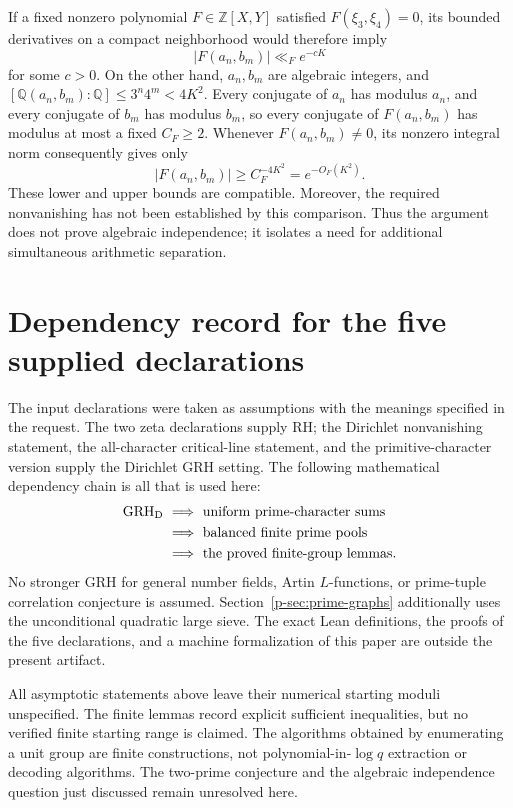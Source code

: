\documentclass[11pt,a4paper]{article}
\theoremstyle{definition}
\theoremstyle{remark}
\begin{document}
If a fixed nonzero polynomial $F\in\mathbb Z[X,Y]$ satisfied
$F(\xi_3,\xi_4)=0$, its bounded derivatives on a compact neighborhood
would therefore imply
\[
 |F(a_n,b_m)|\ll_F e^{-cK}
\]
for some $c>0$. On the other hand, $a_n,b_m$ are algebraic integers,
and
$[\mathbb Q(a_n,b_m):\mathbb Q]\leq3^n4^m<4K^2$.
Every conjugate of $a_n$ has modulus $a_n$, and every conjugate of
$b_m$ has modulus $b_m$, so every conjugate of $F(a_n,b_m)$ has
modulus at most a fixed $C_F\geq2$. Whenever $F(a_n,b_m)\ne0$,
its nonzero integral norm consequently gives only
\[
 |F(a_n,b_m)|\geq C_F^{-4K^2}
 =e^{-O_F(K^2)}.
\]
These lower and upper bounds are compatible. Moreover, the required
nonvanishing has not been established by this comparison. Thus the
argument does not prove algebraic independence; it isolates a need
for additional simultaneous arithmetic separation.



\section{Dependency record for the five supplied declarations}
The input declarations were taken as assumptions with the meanings
specified in the request. The two zeta declarations supply RH; the
Dirichlet nonvanishing statement, the all-character critical-line
statement, and the primitive-character version supply the Dirichlet
GRH setting. The following mathematical dependency chain is all that
is used here:
\[
\begin{aligned}
 \mathrm{GRH}_{\mathrm D}&\ \Longrightarrow\ \text{uniform prime-character sums}\\
       &\ \Longrightarrow\ \text{balanced finite prime pools}\\
       &\ \Longrightarrow\ \text{the proved finite-group lemmas}.
\end{aligned}
\]
No stronger GRH for general number fields, Artin $L$-functions, or
prime-tuple correlation conjecture is assumed. Section~\ref{p-sec:prime-graphs} additionally
uses the unconditional quadratic large sieve. The exact Lean definitions,
the proofs of the five declarations, and a machine formalization of this
paper are outside the present artifact.



All asymptotic statements above leave their numerical starting
moduli unspecified. The finite lemmas record explicit sufficient
inequalities, but no verified finite starting range is claimed.
The algorithms obtained by enumerating a unit group are finite
constructions, not polynomial-in-$\log q$ extraction or decoding
algorithms. The two-prime conjecture and the algebraic independence
question just discussed remain unresolved here.
\end{document}
